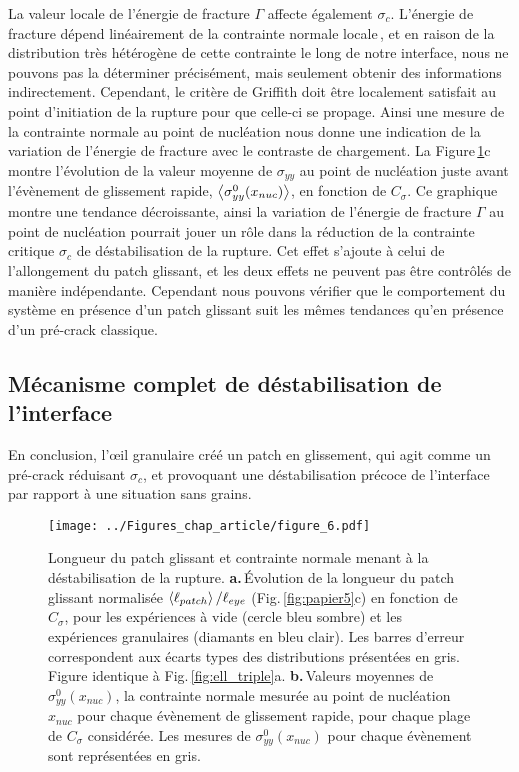 La valeur locale de l'énergie de fracture $\Gamma$ affecte également $\sigma_c$. L'énergie de fracture dépend linéairement de la contrainte normale locale\,\cite{bayart_fracture_2016,bayart_slippery_2016}, et en raison de la distribution très hétérogène de cette contrainte le long de notre interface, nous ne pouvons pas la déterminer précisément, mais seulement obtenir des informations indirectement. Cependant, le critère de Griffith doit être localement satisfait au point d'initiation de la rupture pour que celle-ci se propage. Ainsi une mesure de la contrainte normale au point de nucléation nous donne une indication de la variation de l'énergie de fracture avec le contraste de chargement. La Figure\,\ref{fig:papier6}c montre l'évolution de la valeur moyenne de $\sigma_{yy}$ au point de nucléation juste avant l'évènement de glissement rapide, $\left\langle {\sigma_{yy}^0(x_{nuc})} \right\rangle$, en fonction de $C_\sigma$. Ce graphique montre une tendance décroissante, ainsi la variation de l'énergie de fracture $\Gamma $ au point de nucléation pourrait jouer un rôle dans la réduction de la contrainte critique $\sigma_c$ de déstabilisation de la rupture. Cet effet s'ajoute à celui de l'allongement du patch glissant, et les deux effets ne peuvent pas être contrôlés de manière indépendante. Cependant nous pouvons vérifier que le comportement du système en présence d'un patch glissant suit les mêmes tendances qu'en présence d'un pré-crack classique.





\subsection{Mécanisme complet de déstabilisation de l'interface}


En conclusion, l'œil granulaire créé un patch en glissement, qui agit comme un pré-crack réduisant $\sigma_c$, et provoquant une déstabilisation précoce de l'interface par rapport à une situation sans grains.

\vspace{1cm}

\begin{figure}[htb]
\centering
\texttt{[image: ../Figures\_chap\_article/figure\_6.pdf]}
\caption[Déstabilisation de la rupture]{Longueur du patch glissant et contrainte normale menant à la déstabilisation de la rupture. \textbf{a.}\,Évolution de la longueur du patch glissant normalisée $\left\langle {\ell_{patch}} \right\rangle/\ell_{eye}$ (Fig.\,\ref{fig:papier5}c) en fonction de $C_\sigma$, pour les expériences à vide (cercle bleu sombre) et les expériences granulaires (diamants en bleu clair). Les barres d'erreur correspondent aux écarts types des distributions présentées en gris. Figure identique à Fig.\,\ref{fig:ell_triple}a. \textbf{b.}\,Valeurs moyennes de $\sigma_{yy}^0(x_{nuc})$, la contrainte normale mesurée au point de nucléation $x_{nuc}$ pour chaque évènement de glissement rapide, pour chaque plage de $C_\sigma$ considérée. Les mesures de $\sigma_{yy}^0(x_{nuc})$ pour chaque évènement sont représentées en gris.}
\label{fig:papier6}
\end{figure}



